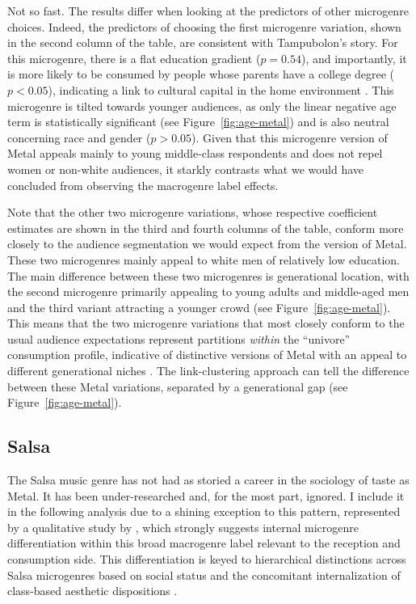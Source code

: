 \documentclass[a4paper,12pt]{extarticle}
\begin{document}
Not so fast. The results differ when looking at the predictors of other microgenre choices. Indeed, the predictors of choosing the first microgenre variation, shown in the second column of the table, are consistent with Tampubolon's story. For this microgenre, there is a flat education gradient ($p = 0.54$), and importantly, it is more likely to be consumed by people whose parents have a college degree ($p < 0.05$), indicating a link to cultural capital in the home environment \citep{bourdieu84}. This microgenre is tilted towards younger audiences, as only the linear negative age term is statistically significant (see Figure~\ref{fig:age-metal}) and is also neutral concerning race and gender ($p > 0.05$). Given that this microgenre version of Metal appeals mainly to young middle-class respondents and does not repel women or non-white audiences, it starkly contrasts what we would have concluded from observing the macrogenre label effects. 

Note that the other two microgenre variations, whose respective coefficient estimates are shown in the third and fourth columns of the table, conform more closely to the audience segmentation we would expect from the version of Metal. These two microgenres mainly appeal to white men of relatively low education. The main difference between these two microgenres is generational location, with the second microgenre primarily appealing to young adults and middle-aged men and the third variant attracting a younger crowd (see Figure~\ref{fig:age-metal}). This means that the two microgenre variations that most closely conform to the usual audience expectations represent partitions \textit{within} the ``univore'' consumption profile, indicative of distinctive versions of Metal with an appeal to different generational niches \citep{koch2020evolutionary}. The link-clustering approach can tell the difference between these Metal variations, separated by a generational gap (see Figure~\ref{fig:age-metal}).

\subsection{Salsa}
The Salsa music genre has not had as storied a career in the sociology of taste as Metal. It has been under-researched and, for the most part, ignored. I include it in the following analysis due to a shining exception to this pattern, represented by a qualitative study by \citet{Bachmayer2014-pk}, which strongly suggests internal microgenre differentiation within this broad macrogenre label relevant to the reception and consumption side. This differentiation is keyed to hierarchical distinctions across Salsa microgenres based on social status and the concomitant internalization of class-based aesthetic dispositions \citep{lizardo2012reconceptualizing}. 
\end{document}
